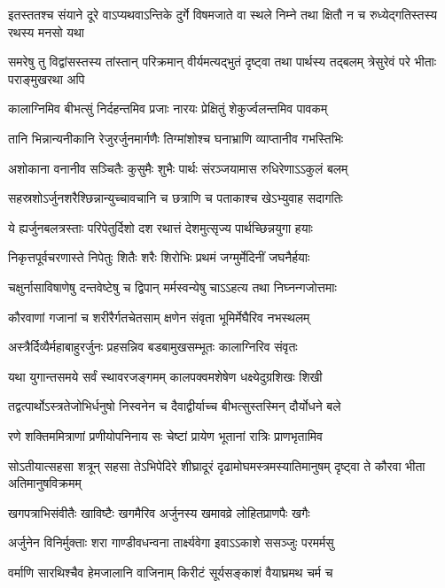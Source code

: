 \threelineshloka
{इतस्ततश्च संयाने दूरे वाऽप्यथवाऽन्तिके}
{दुर्गे विषमजाते वा स्थले निम्ने तथा क्षितौ}
{न च रुध्येद्गतिस्तस्य रथस्य मनसो यथा}


\threelineshloka
{समरेषु तु विद्वांसस्तस्य तांस्तान् परिक्रमान्}
{वीर्यमत्यद्भुतं दृष्ट्वा तथा पार्थस्य तद्बलम्}
{त्रेसुरेवं परे भीताः पराङ्मुखरथा अपि}


\twolineshloka
{कालाग्निमिव बीभत्सुं निर्दहन्तमिव प्रजाः}
{नारयः प्रेक्षितुं शेकुर्ज्वलन्तमिव पावकम्}


\twolineshloka
{तानि भिन्नान्यनीकानि रेजुरर्जुनमार्गणैः}
{तिग्मांशोश्च घनाभ्राणि व्याप्तानीव गभस्तिभिः}


\twolineshloka
{अशोकाना वनानीव सञ्चितैः कुसुमैः शुभैः}
{पार्थः संरञ्जयामास रुधिरेणाऽऽकुलं बलम्}


\twolineshloka
{सहस्रशोऽर्जुनशरैश्छिन्नान्युच्चावचानि च}
{छत्राणि च पताकाश्च खेऽभ्युवाह सदागतिः}


\twolineshloka
{ये ह्यर्जुनबलत्रस्ताः परिपेतुर्दिशो दश}
{रथात्तं देशमुत्सृज्य पार्थच्छिन्नयुगा हयाः}


\twolineshloka
{निकृत्तपूर्वचरणास्ते निपेतुः शितैः शरैः}
{शिरोभिः प्रथमं जग्मुर्मेदिनीं जघनैर्हयाः}


\twolineshloka
{चक्षुर्नासाविषाणेषु दन्तवेष्टेषु च द्विपान्}
{मर्मस्वन्येषु चाऽऽहत्य तथा निघ्नन्गजोत्तमाः}


\twolineshloka
{कौरवाणां गजानां च शरीरैर्गतचेतसाम्}
{क्षणेन संवृता भूमिर्मेघैरिव नभस्थलम्}


\twolineshloka
{अस्त्रैर्दिव्यैर्महाबाहुरर्जुनः प्रहसन्निव}
{बडबामुखसम्भूतः कालाग्निरिव संवृतः}


\twolineshloka
{यथा युगान्तसमये सर्वं स्थावरजङ्गमम्}
{कालपक्वमशेषेण धक्ष्येदुग्रशिखः शिखी}


\twolineshloka
{तद्वत्पार्थोऽस्त्रतेजोभिर्धनुषो निस्वनेन च}
{दैवाद्वीर्याच्च बीभत्सुस्तस्मिन् दौर्योधने बले}


\twolineshloka
{रणे शक्तिममित्राणां प्रणीयोपनिनाय सः}
{चेष्टां प्रायेण भूतानां रात्रिः प्राणभृतामिव}


\threelineshloka
{सोऽतीयात्सहसा शत्रून् सहसा तेऽभिपेदिरे}
{शीघ्रादूरं दृढामोघमस्त्रमस्यातिमानुषम्}
{दृष्ट्वा ते कौरवा भीता अतिमानुषविक्रमम्}


\twolineshloka
{खगपत्राभिसंवीतैः खाविष्टैः खगमैरिव}
{अर्जुनस्य खमावव्रे लोहितप्राणपैः खगैः}


\twolineshloka
{अर्जुनेन विनिर्मुक्ताः शरा गाण्डीवधन्वना}
{तार्क्ष्यवेगा इवाऽऽकाशे ससञ्जुः परमर्मसु}


\twolineshloka
{वर्माणि सारथिश्चैव हेमजालानि वाजिनाम्}
{किरीटं सूर्यसङ्काशं वैयाघ्रमथ चर्म च}


